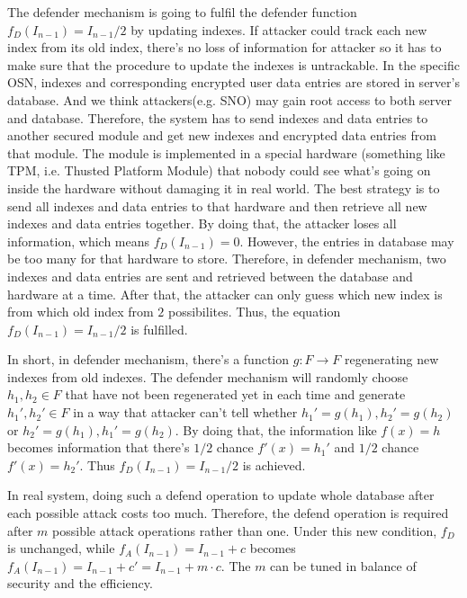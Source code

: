 \documentclass[10pt, conference, compsocconf]{IEEEtran}
\begin{document}
		The defender mechanism is going to fulfil the defender
		function $f_D(I_{n-1}) = I_{n-1}/2$ by updating indexes.
		If attacker
		could track each new index from its old index, there's no loss of information 
		for attacker so it has to make sure that the procedure to update the indexes
		is untrackable.
		In the specific OSN, indexes and corresponding encrypted user data entries are stored
		in server's database. And we think attackers(e.g. SNO) may gain root access to 
		both server and database. Therefore, the system has to send 
		indexes and data entries to another 
		secured module and get new indexes and encrypted data 
		entries from that module. 
		The module is implemented in a special hardware (something 
		like TPM, i.e. Thusted Platform Module) that nobody
		could see what's going on inside the hardware without damaging it in real world.
		The best strategy 
		is to send all indexes and data entries to that hardware and then
		retrieve all new indexes and data entries together. By doing that, the attacker
		loses all information, which means $f_D(I_{n-1}) = 0$. However, the entries
		in database may be too many for that hardware to store. Therefore, in defender mechanism,
		two indexes and data entries are sent and retrieved
		between the database and hardware at a time. After that, the attacker can
		only guess which new index is from which old index from $2$ possibilites.
		Thus, the equation $f_D(I_{n-1}) = I_{n-1}/2$ is fulfilled.
		
		In short, in defender mechanism,
		there's a function $g: F \rightarrow F$ regenerating 
		new indexes from old indexes. The defender mechanism
		will randomly choose $h_1, h_2 \in F$ that have
		not been regenerated yet in each time and generate
		$h_1', h_2' \in F$ in a way that attacker can't tell whether
		$h_1' = g(h_1), h_2' = g(h_2)$ or $h_2' = g(h_1), h_1' = g(h_2)$.
		By doing that, the information like $f(x) = h$ becomes
		information that there's $1/2$ chance $f'(x) = h_1'$ and $1/2$ chance $f'(x) = h_2'$.
		Thus $f_D(I_{n-1}) = I_{n-1}/2$ is achieved.
		
		In real system, doing such a defend operation to update whole
		database after each possible attack costs too much.
		Therefore, the defend operation is required after $m$
		possible attack operations rather than one. Under this
		new condition, $f_D$ is unchanged, while $f_A(I_{n-1}) = I_{n-1}+c$
		becomes $f_A(I_{n-1}) = I_{n-1}+c' = I_{n-1}+m \cdot c$.
		The $m$ can be tuned in balance of security and the
		efficiency.
		
\end{document}
